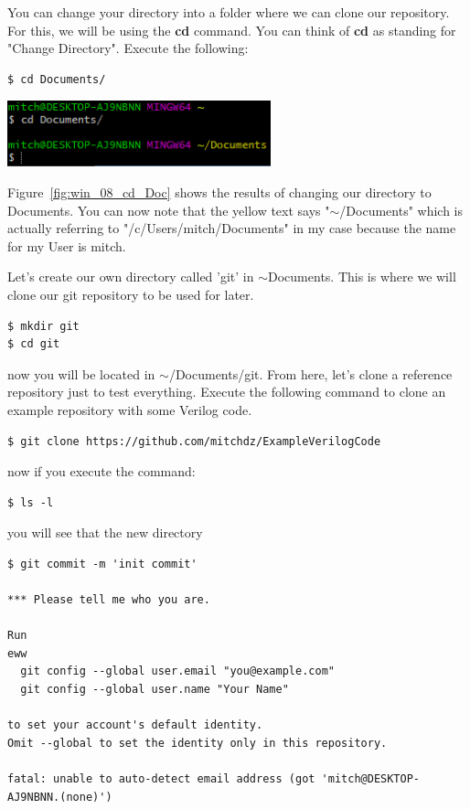 \documentclass[12pt]{article}
\begin{document}
You can change your directory into a folder where we can clone our repository. For this, we will be using the \textbf{cd} command. You can think of \textbf{cd} as standing for "Change Directory". Execute the following:

\begin{lstlisting}
$ cd Documents/
\end{lstlisting}

\begin{center}
    \includegraphics[width=3in]{win_08_cd_Doc.PNG}
    \label{fig:win_08_cd_Doc}
\end{center}

Figure~\ref{fig:win_08_cd_Doc} shows the results of changing our directory to Documents. You can now note that the yellow text says "$\sim$/Documents" which is actually referring to "/c/Users/mitch/Documents" in my case because the name for my User is mitch.

Let's create our own directory called 'git' in $\sim$Documents. This is where we will clone our git repository to be used for later.

\begin{lstlisting}
$ mkdir git
$ cd git
\end{lstlisting}

now you will be located in $\sim$/Documents/git. From here, let's clone a reference repository just to test everything. Execute the following command to clone an example repository with some Verilog code.

\begin{lstlisting}
$ git clone https://github.com/mitchdz/ExampleVerilogCode
\end{lstlisting}

now if you execute the command:

\begin{lstlisting}
$ ls -l
\end{lstlisting}

you will see that the new directory 





\begin{verbatim}
$ git commit -m 'init commit'

*** Please tell me who you are.

Run
eww
  git config --global user.email "you@example.com"
  git config --global user.name "Your Name"

to set your account's default identity.
Omit --global to set the identity only in this repository.

fatal: unable to auto-detect email address (got 'mitch@DESKTOP-AJ9NBNN.(none)')
\end{verbatim}
\end{document}
